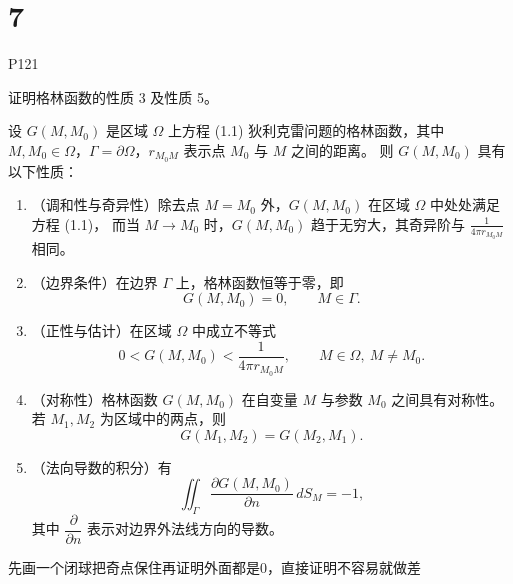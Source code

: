 \section{7}
P121
\begin{homework}[1]
证明格林函数的性质 3 及性质 5。
\end{homework}
\begin{theorem}[格林函数的基本性质]
设 $G(M,M_0)$ 是区域 $\Omega$ 上方程 (1.1) 狄利克雷问题的格林函数，其中
$M,M_0\in\Omega$，$\Gamma=\partial\Omega$，$r_{M_0M}$ 表示点 $M_0$ 与 $M$ 之间的距离。
则 $G(M,M_0)$ 具有以下性质：

\begin{enumerate}
  \item （调和性与奇异性）除去点 $M=M_0$ 外，$G(M,M_0)$ 在区域 $\Omega$ 中处处满足方程 (1.1)，
        而当 $M\to M_0$ 时，$G(M,M_0)$ 趋于无穷大，其奇异阶与
        \(\displaystyle \frac{1}{4\pi r_{M_0M}}\) 相同。

  \item （边界条件）在边界 $\Gamma$ 上，格林函数恒等于零，即
        \[
        G(M,M_0)=0,\qquad M\in\Gamma .
        \]

  \item （正性与估计）在区域 $\Omega$ 中成立不等式
        \[
        0 < G(M,M_0) < \frac{1}{4\pi r_{M_0M}},\qquad M\in\Omega,\ M\neq M_0 .
        \]

  \item （对称性）格林函数 $G(M,M_0)$ 在自变量 $M$ 与参数 $M_0$ 之间具有对称性。
        若 $M_1,M_2$ 为区域中的两点，则
        \[
        G(M_1,M_2)=G(M_2,M_1).
        \]

  \item （法向导数的积分）有
        \[
        \iint_{\Gamma} \frac{\partial G(M,M_0)}{\partial n}\, dS_M = -1,
        \]
        其中 $\dfrac{\partial}{\partial n}$ 表示对边界外法线方向的导数。
\end{enumerate}
\end{theorem}
\begin{dxtips}
    先画一个闭球把奇点保住再证明外面都是0，直接证明不容易就做差
    
\end{dxtips}
